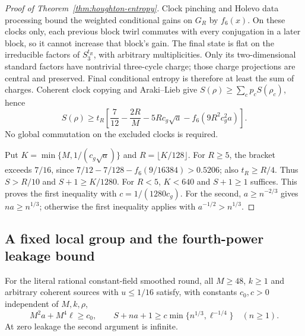 \begin{proof}[Proof of Theorem~\ref{thm:houghton-entropy}]
Clock pinching and Holevo data processing bound the weighted
conditional gains on $G_R$ by $f_6(x)$. On these clocks only, each
previous block twirl commutes with every conjugation in a later
block, so it cannot increase that block's gain. The final state is
flat on the irreducible factors of $S_3^{t_R}$, with arbitrary
multiplicities. Only its two-dimensional standard factors have
nontrivial three-cycle charge; those charge projections are central
and preserved. Final conditional entropy is therefore at least the
sum of charges. Coherent clock copying and Araki--Lieb give
$S(\rho)\geq\sum_cp_cS(\rho_c)$, hence
\[
 S(\rho)\geq t_R\left[\frac7{12}-\frac{2R}{M}
       -5Rc_g\sqrt a-f_6(9R^2c_g^2a)\right].
\]
No global commutation on the excluded clocks is required.

Put $K=\min\{M,1/(c_g\sqrt a)\}$ and $R=\lfloor K/128\rfloor$.
For $R\geq5$, the bracket exceeds $7/16$, since
$7/12-7/128-f_6(9/16384)>0.5206$; also $t_R\geq R/4$.
Thus $S>R/10$ and $S+1\geq K/1280$.
For $R<5$, $K<640$ and $S+1\geq1$ suffices.
This proves the first inequality with $c=1/(1280c_g)$.
For the second, $a\geq n^{-2/3}$ gives $na\geq n^{1/3}$;
otherwise the first inequality applies with $a^{-1/2}>n^{1/3}$.
\end{proof}

\subsection{A fixed local group and the fourth-power leakage bound}

\begin{theorem}\label{thm:houghton-flux}
For the literal rational constant-field smoothed round, all
$M\geq48$, $k\geq1$ and arbitrary coherent sources with $u\leq1/16$
satisfy, with constants $c_0,c>0$ independent of $M,k,\rho$,
\[
 M^2a+M^4\ell\geq c_0,\qquad
 S+na+1\geq c\min\{n^{1/3},\ell^{-1/4}\}\quad(n\geq1).
\]
At zero leakage the second argument is infinite.
\end{theorem}

